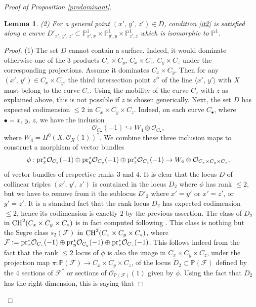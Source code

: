 \documentclass[10pt]{article}
\newtheorem{lemm}[theo]{Lemma}
\begin{document}
\begin{proof}[Proof of Proposition \ref{prodominant}]
\begin{lemm}
(2) For a general point $(x',\,y',\,z')\in D$, condition \ref{it2} is satisfied along a curve $D'_{x',\,y',\,z'}\subset \mathbb{P}^1_{x',x}\times \mathbb{P}^1_{y',y}\times \mathbb{P}^1_{z',z}$ which is isomorphic to $\mathbb{P}^1$.
\end{lemm}
\begin{proof} (1) The set $D$ cannot contain a surface. Indeed, it would dominate otherwise one of the 3 products $C_x\times C_y$, $C_x\times C_z$, $C_y\times C_z$ under the corresponding projections. Assume it dominates $C_x\times C_y$. Then for any $(x',\,y')\in C_x\times C_y$, the third intersection point $z''$ of the line $\langle x',\,y'\rangle$ with $X$ must belong to the curve $C_z$. Using the mobility of  the curve $C_z$  with $z$ as explained above, this is not possible if $z$ is chosen generically. Next, the set $D$ has expected codimension $\leq 2$ in $C_x\times C_y\times C_z$. Indeed, on each curve $C_\bullet$, where  $\bullet=x,\,y,\,z$, we have
the inclusion
$$\mathcal{O}_{C_\bullet} (-1)\hookrightarrow W_4\otimes \mathcal{O}_{C_\bullet},$$
where $W_4=H^0(X,\mathcal{O}_X(1))^*$.
We combine these three inclusion maps to construct a morphism of vector bundles
\begin{eqnarray}\label{eqmophvnun}\phi: {\rm pr}_x^*\mathcal{O}_{C_x} (-1)\oplus {\rm pr}_y^*\mathcal{O}_{C_y} (-1)\oplus {\rm pr}_z^*\mathcal{O}_{C_z} (-1)\rightarrow W_4\otimes \mathcal{O}_{C_x\times C_y\times C_z},\end{eqnarray}
of vector bundles of respective ranks $3$ and $4$.
It is clear that the locus $D$ of collinear triples $(x',\,y',\,z')$ is contained in the locus $D_2$ where $\phi$ has rank $\leq 2$, but  we have to remove from it the sublocus $D'_2$ where $x'=y'$ or $x'=z'$, or $y'=z'$. It is a standard fact that the rank locus $D_2$ has expected codimension $\leq 2$, hence its codimension is exactly $2$ by the previous assertion. The class of $D_2$ in ${\rm CH}^2(C_x\times C_y\times C_z)$ is in fact computed following \cite{fulton}. This class is nothing but the Segre class
$s_2(\mathcal{F})$ in ${\rm CH}^2(C_x\times C_y\times C_z)$, where $\mathcal{F}:={\rm pr}_x^*\mathcal{O}_{C_x} (-1)\oplus {\rm pr}_y^*\mathcal{O}_{C_y} (-1)\oplus {\rm pr}_z^*\mathcal{O}_{C_z} (-1)$. This follows indeed from  the fact that the rank $\leq 2$ locus of $\phi$ is also the image in $C_x\times C_y\times C_z$, under the projection map $\pi: \mathbb{P}(\mathcal{F})\rightarrow C_x\times C_y\times C_z$, of the locus
$\widetilde{D}_2\subset \mathbb{P}(\mathcal{F})$ defined by the $4$ sections of $\mathcal{F}^*$ or sections of $\mathcal{O}_{\mathbb{P}(\mathcal{F})}(1)$ given by $ \phi$. Using the fact that $D_2$ has the right dimension, this is saying that

\end{proof}
\end{proof}
\end{document}
